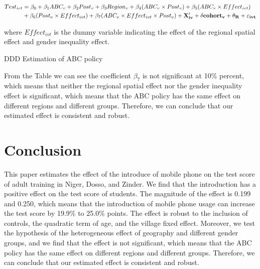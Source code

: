 \documentclass[12pt]{jfm}
\begin{document}
\begin{equation}
  \begin{aligned}
  Test_{ivt} & = \beta_0 + \beta_1 ABC_{v} + \beta_2 Post_{v} + \beta_3 Region_{v} + \beta_4 (ABC_v \times Post_v) + \beta_5 (ABC_v \times Effect_{ivt}) \\
  & + \beta_6 (Post_v \times Effect_{ivt}) + \beta_7 (ABC_v \times Effect_{ivt} \times Post_v) + \bf{X}_{iv}^\prime + \delta cohort_{v} + \theta_R + \varepsilon_{ivt}  \label{eq:ddd}
  \end{aligned}
\end{equation}

where $Effect_{ivt}$ is the dummy variable indicating the effect of the regional spatial effect and gender inequality effect.

\begin{table}
  \begin{center}
    \begin{footnotesize}
    \caption{DDD Estimation of ABC policy}
    \label{tab:ddd}
    
    \end{footnotesize}
  \end{center}
\end{table}

From the Table we can see the coefficient $\beta_7$ is not significant at 10\% percent, which means that neither the regional spatial effect nor the gender inequality effect is significant, which means that the ABC policy has the same effect on different regions and different groups. Therefore, we can conclude that our estimated effect is consistent and robust.

\section{Conclusion} \label{sec:conclusion}

This paper estimates the effect of the introduce of mobile phone on the test score of adult training in Niger, Dosso, and Zinder. We find that the introduction has a positive effect on the test score of students. The magnitude of the effect is 0.199 and 0.250, which means that the introduction of mobile phone usage can increase the test score by 19.9\% to 25.0\% points. The effect is robust to the inclusion of controls, the quadratic term of age, and the village fixed effect. Moreover, we test the hypothesis of the heterogeneous effect of geography and different gender groups, and we find that the effect is not significant, which means that the ABC policy has the same effect on different regions and different groups. Therefore, we can conclude that our estimated effect is consistent and robust.
\end{document}
